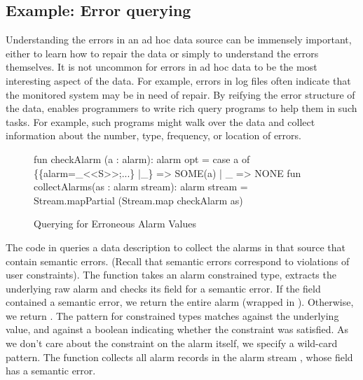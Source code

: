 \subsection{Example: Error querying}
Understanding the errors in an ad hoc data source can be immensely important, 
either to learn how to repair the data or simply to understand the errors themselves.  It is not uncommon for errors in ad hoc data to be the most interesting aspect of the data.  For example, errors in log files often indicate that the monitored system may be in need of repair.
By reifying the error structure of the data, \datatype{} enables programmers to write rich query programs to help them in such tasks.
For example, such programs might walk over the data and collect
information about the number, type, frequency, or location of errors.


\begin{figure}
  \centering
\begin{code}
fun checkAlarm (a : alarm): alarm opt =
    case a of 
	\{\{alarm=_<<S>>;...\} |_\} => SOME(a)
      | _ => NONE
\mbox{}
fun collectAlarms(as : alarm stream): alarm stream =
    Stream.mapPartial (Stream.map checkAlarm as)  
\end{code}
  \caption{Querying for Erroneous Alarm Values}
  \label{fig:ex-error-query}
\end{figure}

The code in  queries a \darkstar{} data
description to collect the alarms in that source that contain semantic errors. 
(Recall that semantic errors correspond to violations of user
constraints). The function  takes an alarm constrained type,
extracts the underlying raw alarm and checks its  field for
a semantic error.  If the  field contained a semantic error,
we return the entire alarm (wrapped in ). Otherwise, we
return . The pattern  for constrained types
matches  against the underlying value, and  against
a boolean indicating whether the constraint was satisfied. As we don't
care about the constraint on the alarm itself, we specify a wild-card
pattern.   The function 
collects all alarm records in the alarm stream , whose
 field has a semantic error.


